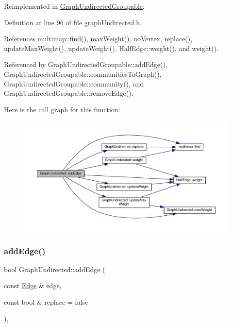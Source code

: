 Reimplemented in \hyperlink{classGraphUndirectedGroupable_a8c010517bff903a50807e6e8ad8cc6db}{Graph\+Undirected\+Groupable}.



Definition at line 96 of file graph\+Undirected.\+h.



References multimap\+::find(), max\+Weight(), no\+Vertex, replace(), update\+Max\+Weight(), update\+Weight(), Half\+Edge\+::weight(), and weight().



Referenced by Graph\+Undirected\+Groupable\+::add\+Edge(), Graph\+Undirected\+Groupable\+::communities\+To\+Graph(), Graph\+Undirected\+Groupable\+::community(), and Graph\+Undirected\+Groupable\+::remove\+Edge().

Here is the call graph for this function\+:
\nopagebreak
\begin{figure}[H]
\begin{center}
\leavevmode
\includegraphics[width=350pt]{classGraphUndirected_a2be69d987f3b4fa1cf547898d30b47d2_cgraph}
\end{center}
\end{figure}
\mbox{\label{classGraphUndirected_a366c8b7dbf1cbfe408d5399ad64494dc}} 
\subsubsection{\texorpdfstring{add\+Edge()}{addEdge()}\hspace{0.1cm}{\footnotesize\ttfamily [2/2]}}
{\footnotesize\ttfamily bool Graph\+Undirected\+::add\+Edge (\begin{DoxyParamCaption}\item[{const \hyperlink{classEdge}{Edge} \&}]{edge,  }\item[{const bool \&}]{replace = {\ttfamily false} }\end{DoxyParamCaption})\hspace{0.3cm}{\ttfamily [inline]}, {\ttfamily [virtual]}}


